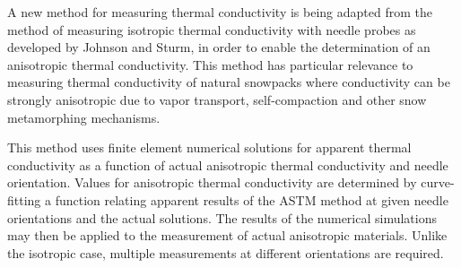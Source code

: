 A new method for measuring thermal conductivity is being adapted from the method
of measuring isotropic thermal conductivity with needle probes as developed by
Johnson and Sturm, in order to enable the determination of an anisotropic
thermal conductivity. \cite{sturm1,sturm2} This method has particular relevance to measuring thermal
conductivity of natural snowpacks where conductivity can be strongly anisotropic
due to vapor transport, self-compaction and other snow metamorphing mechanisms.

This method uses finite element numerical solutions for apparent thermal
conductivity as a function of actual anisotropic thermal conductivity and needle
orientation. Values for anisotropic thermal conductivity are determined by
curve-fitting a function relating apparent results of the ASTM method at given
needle orientations and the actual solutions. The results of the numerical
simulations may then be applied to the measurement of actual anisotropic
materials. Unlike the isotropic case, multiple measurements at different
orientations are required.
